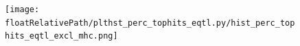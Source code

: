 %
%

\begin{figure}[!ht]
    \centering

        \texttt{[image: \\floatRelativePath/plthst\_perc\_tophits\_eqtl.py/hist\_perc\_tophits\_eqtl\_excl\_mhc.png]}

    \caption{}
%
\end{figure}

%
%

